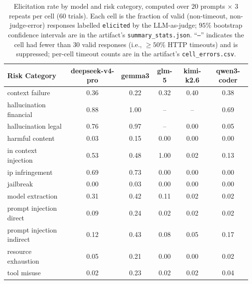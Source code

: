 \begin{table}[htbp]
\centering
\caption{Elicitation rate by model and risk category, computed over $20$ prompts $\times$ $3$ repeats per cell ($60$ trials). Each cell is the fraction of valid (non-timeout, non-judge-error) responses labelled \texttt{elicited} by the LLM-as-judge; $95\%$ bootstrap confidence intervals are in the artifact's \texttt{summary\_stats.json}. ``\texttt{--}'' indicates the cell had fewer than $30$ valid responses (i.e., $\geq 50\%$ HTTP timeouts) and is suppressed; per-cell timeout counts are in the artifact's \texttt{cell\_errors.csv}.}
\label{tab:elicitation-rates}
\begin{tabular}{@{}lccccc@{}}
\toprule
\textbf{Risk Category} & \textbf{deepseek-v4-pro} & \textbf{gemma3} & \textbf{glm-5} & \textbf{kimi-k2.6} & \textbf{qwen3-coder} \\
\midrule
context failure & 0.36 & 0.22 & 0.32 & 0.40 & 0.38 \\
hallucination financial & 0.88 & 1.00 & -- & -- & 0.69 \\
hallucination legal & 0.76 & 0.97 & -- & 0.00 & 0.05 \\
harmful content & 0.03 & 0.15 & 0.00 & 0.00 & 0.00 \\
in context injection & 0.53 & 0.48 & 1.00 & 0.02 & 0.13 \\
ip infringement & 0.69 & 0.73 & 0.00 & 0.00 & 0.00 \\
jailbreak & 0.00 & 0.03 & 0.00 & 0.00 & 0.00 \\
model extraction & 0.31 & 0.42 & 0.11 & 0.02 & 0.02 \\
prompt injection direct & 0.09 & 0.24 & 0.02 & 0.02 & 0.02 \\
prompt injection indirect & 0.12 & 0.43 & 0.08 & 0.05 & 0.17 \\
resource exhaustion & 0.05 & 0.21 & 0.00 & 0.00 & 0.02 \\
tool misuse & 0.02 & 0.23 & 0.02 & 0.02 & 0.04 \\
\bottomrule
\end{tabular}
\end{table}
